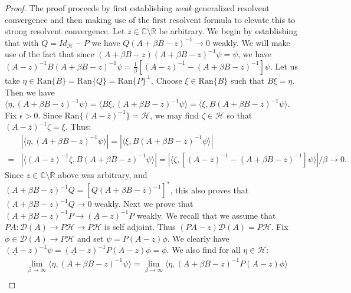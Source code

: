 \documentclass[reqno,12pt,letterpaper]{amsart}
\numberwithin{equation}{section}
\newcommand{\1}{\mathds{1}}
\theoremstyle{definition}
\begin{document}
	\begin{proof}
		The proof proceeds by first establishing \textit{weak} generalized resolvent convergence and then making use of the first resolvent formula to elevate this to strong resolvent convergence. Let $z \in \mathds{C}\setminus\mathbb{R}$ be arbitrary. 
		We begin by establishing that with $Q = Id_{\mathcal{H}} - P$ we have $Q(A + \beta B-z)^{-1}\rightarrow 0$ weakly. We will make use of the fact that since $(A + \beta B -z)(A + \beta B -z)^{-1} \psi = \psi$, we have
		$
		(A - z)^{-1}
		B (A + \beta B - z)^{-1} \psi = \frac{1}{\beta}  \left[	(A - z)^{-1} - (A + \beta B - z)^{-1}\right] \psi.
			$
		Let us take $\eta \in \text{Ran}\{B\} = \text{Ran}\{Q\} = \text{Ran}\{P\}^\perp$. Choose $\xi \in \text{Ran}\{B\}$ such that $B \xi = \eta$.  Then we have 
	$
		\langle \eta, (A + \beta B -z)^{-1} \psi \rangle = \langle B\xi, (A + \beta B -z)^{-1} \psi \rangle = \langle \xi, B(A + \beta B -z)^{-1} \psi \rangle.
		$
		Fix $\epsilon >0$. Since $\text{Ran}\{(A-\overline{z})^{-1}\} = \mathcal{H}$,
we may find $\zeta \in \mathcal{H}$ so that 
	$
	(A-\overline{z})^{-1} \zeta = \xi.
	$
		Thus:
		\begin{align}
		&\left| \langle \eta,  (A + \beta B -z)^{-1} \psi\rangle \right| = \left| \langle \xi, B (A + \beta B -z)^{-1} \psi\rangle \right| \\
		=
		&	\left| \langle (A-\overline{z})^{-1} \zeta, B (A + \beta B -z)^{-1} \psi\rangle \right| 
		= 
\left| \langle \zeta,  \left[	(A - z)^{-1} - (A + \beta B - z)^{-1}\right]	\psi\rangle \right|/\beta
	\rightarrow 0.
		\end{align}
	 Since $z \in \mathds{C}\setminus\mathds{R}$  above was arbitrary, and $(A + \beta B -z)^{-1} Q = \left[Q (A + \beta B -\overline{z})^{-1}  \right]^*$, this also proves that $(A + \beta B -z)^{-1} Q \rightarrow 0$ weakly.
		Next we prove that $(A + \beta B -z)^{-1} P \rightarrow (\underline{A} - z)^{-1}P$ weakly. We recall that we assume that $PA:\mathcal{D}(A) \rightarrow P\mathcal{H} \rightarrow P\mathcal{H}$ is  self adjoint. Thus $(PA - z)\mathcal{D}(A)  = P\mathcal{H}$. Fix $\phi \in \mathcal{D}(A) \rightarrow P\mathcal{H}$ and set $\psi = P(A - z)\phi$.
We clearly have 
	$
			(\underline{A}-z)^{-1} \psi = (\underline{A}-z)^{-1}  P(A - z) \phi = \phi.
	$
		We also find for all $ \eta \in \mathcal{H}$:
		\begin{align}
		&\lim\limits_{\beta \rightarrow \infty} \langle \eta, (A + \beta B - z)^{-1} \psi \rangle	
		= \lim\limits_{\beta \rightarrow \infty} \langle \eta, (A + \beta B - z)^{-1} P(A - z) \phi \rangle\\

\end{align}
\end{proof}
\end{document}
